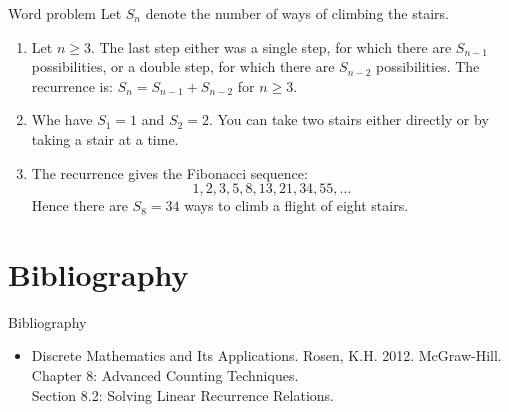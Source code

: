 \documentclass{beamer}
\begin{document}
\begin{frame}{Word problem}
    Let $S_n$ denote the number of ways of climbing the stairs.
    \begin{enumerate}[<+->]
        \item Let $n \geq 3$.  The last step either was a single step, for which there are $S_{n-1}$ possibilities, or a double step, for which there are $S_{n-2}$ possibilities.  The recurrence is: $ S_n = S_{n-1} + S_{n-2} $ for $n \geq 3$.
        \item Whe have $S_1 = 1$ and $S_2 = 2$.  You can take two stairs either directly or by taking a stair at a time.
        \item The recurrence gives the Fibonacci sequence:
        $$ 1,2,3,5,8,13,21,34,55,\ldots $$
        Hence there are $S_8 = 34$ ways to climb a flight of eight stairs.
    \end{enumerate}
\end{frame}

\section*{Bibliography}

\begin{frame}{Bibliography}
    \begin{itemize}
        \item Discrete Mathematics and Its Applications. Rosen, K.H. 2012. McGraw-Hill. \\
        Chapter 8: Advanced Counting Techniques. \\
        Section 8.2: Solving Linear Recurrence Relations.
    \end{itemize}
\end{frame}
\end{document}
